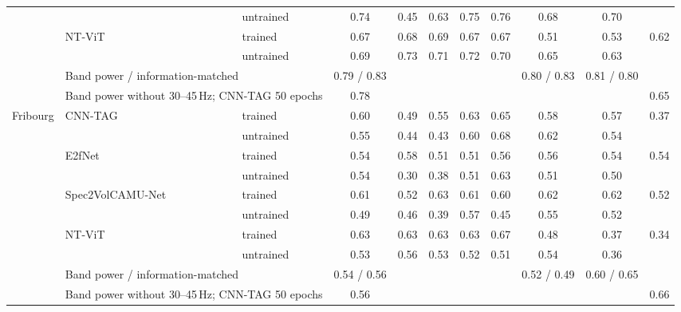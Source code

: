 \documentclass[10pt]{article}
\begin{document}
\begin{longtable}{l l l c c c c c c c c}
 &  & untrained & 0.74 & 0.45 & 0.63 & 0.75 & 0.76 & 0.68 & 0.70 &  \\
 & NT-ViT & trained & 0.67 & 0.68 & 0.69 & 0.67 & 0.67 & 0.51 & 0.53 & 0.62 \\
 &  & untrained & 0.69 & 0.73 & 0.71 & 0.72 & 0.70 & 0.65 & 0.63 &  \\
 & \multicolumn{2}{l}{Band power / information-matched} & 0.79 / 0.83 & & & & & 0.80 / 0.83 & 0.81 / 0.80 & \\
 & \multicolumn{2}{l}{Band power without 30--45\,Hz; CNN-TAG 50 epochs} & 0.78 & & & & & & & 0.65 \\ \midrule
Fribourg & CNN-TAG & trained & 0.60 & 0.49 & 0.55 & 0.63 & 0.65 & 0.58 & 0.57 & 0.37 \\
 &  & untrained & 0.55 & 0.44 & 0.43 & 0.60 & 0.68 & 0.62 & 0.54 &  \\
 & E2fNet & trained & 0.54 & 0.58 & 0.51 & 0.51 & 0.56 & 0.56 & 0.54 & 0.54 \\
 &  & untrained & 0.54 & 0.30 & 0.38 & 0.51 & 0.63 & 0.51 & 0.50 &  \\
 & Spec2VolCAMU-Net & trained & 0.61 & 0.52 & 0.63 & 0.61 & 0.60 & 0.62 & 0.62 & 0.52 \\
 &  & untrained & 0.49 & 0.46 & 0.39 & 0.57 & 0.45 & 0.55 & 0.52 &  \\
 & NT-ViT & trained & 0.63 & 0.63 & 0.63 & 0.63 & 0.67 & 0.48 & 0.37 & 0.34 \\
 &  & untrained & 0.53 & 0.56 & 0.53 & 0.52 & 0.51 & 0.54 & 0.36 &  \\
 & \multicolumn{2}{l}{Band power / information-matched} & 0.54 / 0.56 & & & & & 0.52 / 0.49 & 0.60 / 0.65 & \\
 & \multicolumn{2}{l}{Band power without 30--45\,Hz; CNN-TAG 50 epochs} & 0.56 & & & & & & & 0.66 \\ \midrule
\bottomrule
\end{longtable}
\end{document}
